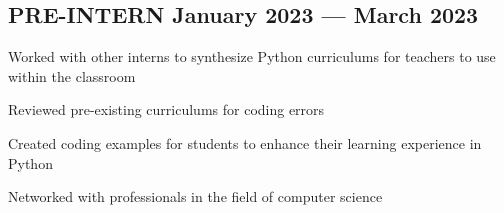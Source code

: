 \subsection{{PRE-INTERN \hfill January 2023 --- March 2023}}
\begin{zitemize}
\item Worked with other interns to synthesize Python curriculums for teachers to use within the classroom
\item Reviewed pre-existing curriculums for coding errors
\item Created coding examples for students to enhance their learning experience in Python
\item Networked with professionals in the field of computer science
\end{zitemize}

